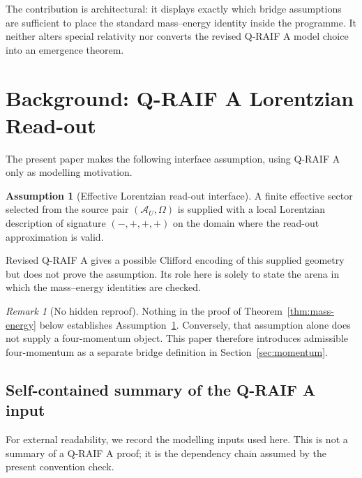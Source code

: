 \documentclass[12pt,a4paper]{article}
\theoremstyle{definition}
\newtheorem{assumption}[theorem]{Assumption}
\theoremstyle{remark}
\newtheorem{remark}[theorem]{Remark}
\newcommand{\AU}{\mathcal{A}_U}
\newcommand{\Omegastate}{\Omega}
\begin{document}
The contribution is architectural: it displays exactly which bridge assumptions are sufficient to place the standard mass--energy identity inside the programme.  It neither alters special relativity nor converts the revised Q-RAIF A model choice into an emergence theorem.

\section{Background: Q-RAIF A Lorentzian Read-out}
\label{sec:qraif-background}

The present paper makes the following interface assumption, using Q-RAIF A only as modelling motivation.

\begin{assumption}[Effective Lorentzian read-out interface]
\label{ass:qraif-readout}
A finite effective sector selected from the source pair $(\AU,\Omegastate)$ is supplied with a local Lorentzian description of signature $(-,+,+,+)$ on the domain where the read-out approximation is valid.
\end{assumption}

Revised Q-RAIF A gives a possible Clifford encoding of this supplied geometry but does not prove the assumption.  Its role here is solely to state the arena in which the mass--energy identities are checked.

\begin{remark}[No hidden reproof]
Nothing in the proof of Theorem~\ref{thm:mass-energy} below establishes Assumption~\ref{ass:qraif-readout}. Conversely, that assumption alone does not supply a four-momentum object. This paper therefore introduces admissible four-momentum as a separate bridge definition in Section~\ref{sec:momentum}.
\end{remark}

\subsection{Self-contained summary of the Q-RAIF A input}
\label{sec:qraif-summary}

For external readability, we record the modelling inputs used here.  This is not a summary of a Q-RAIF A proof; it is the dependency chain assumed by the present convention check.
\end{document}
